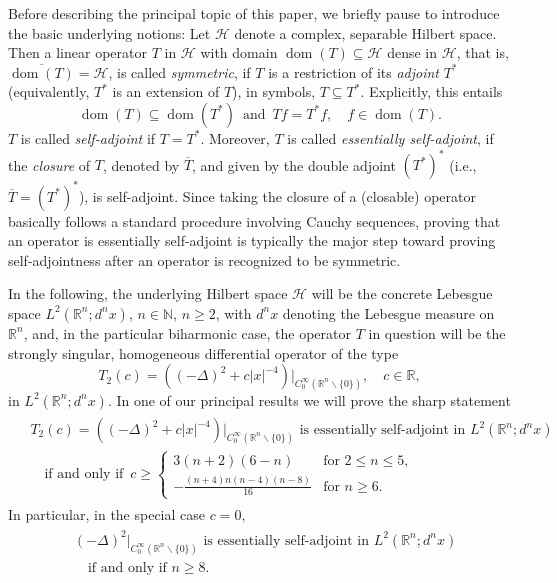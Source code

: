 \documentclass[reqno,11pt,centertags]{amsart}
\newcommand{\bbN}{{\mathbb{N}}}
\newcommand{\bbR}{{\mathbb{R}}}
\newcommand{\cH}{{\mathcal H}}
\newcommand{\<}{\langle}
\renewcommand{\>}{\rangle}
\newcommand{\lb}{\label}
\newcommand{\ol}{\overline}
\newcommand{\dom}{\operatorname{dom}}
\numberwithin{equation}{section}
\theoremstyle{definition}
\begin{document}
Before describing the principal topic of this paper, we briefly pause to introduce the basic underlying notions: Let $\cH$ denote a complex, separable Hilbert space. Then a linear operator $T$ in $\cH$ with domain $\dom(T) \subseteq \cH$ dense in $\cH$, that is, $\ol{\dom(T)} = \cH$, is called {\it symmetric}, if $T$ is a restriction of its {\it adjoint} $T^*$ (equivalently, $T^*$ is an extension of $T$), in symbols, $T \subseteq T^*$. Explicitly, this entails 
\begin{equation}
\dom(T) \subseteq \dom(T^*) \, \text{ and } \, Tf = T^*f, \quad f \in \dom(T). 
\end{equation} 
$T$ is called {\it self-adjoint} if $T=T^*$. Moreover, $T$ is called {\it essentially self-adjoint}, if the {\it closure} of $T$, denoted by $\ol T$, and given by the double adjoint $(T^*)^*$ (i.e., $\ol T = (T^*)^*$), is self-adjoint. Since taking the closure of a (closable) operator basically follows a standard procedure involving Cauchy sequences, proving that an operator is essentially self-adjoint is typically the major step toward proving self-adjointness after an operator is recognized to be symmetric. 

In the following, the underlying Hilbert space $\cH$ will be the concrete Lebesgue space $L^2(\bbR^n;d^nx)$, $n \in \bbN$, $n \geq 2$, with $d^n x$ denoting the Lebesgue measure on $\bbR^n$, and, in the particular biharmonic case,  the operator $T$ in question will be the strongly singular, homogeneous differential operator of the type 
\begin{equation}
T_2(c) = \left((-\Delta)^2 +c|x|^{-4}\right)\big|_{C_0^{\infty}(\bbR^n \backslash \{0\})}, \quad c \in \bbR,  
\end{equation}
in $L^2(\bbR^n;d^nx)$. In one of our principal results we will prove the sharp statement 
\begin{align} 
\begin{split} 
& \text{$T_2(c)=\left((-\Delta)^2 +c|x|^{-4}\right)\big|_{C_0^{\infty}(\bbR^n \backslash \{0\})}$ is essentially self-adjoint in $L^2(\bbR^n;d^nx)$}     \lb{1.3}\\
& \quad \text{if and only if } \,  
c \geq \begin{cases}
3(n+2)(6-n) & \mbox{for $2\leq n\leq 5$},   \\[5pt]
{\displaystyle -\frac{(n+4)n(n-4)(n-8)}{16}}& \mbox{for $n\geq 6$}.
\end{cases}
\end{split} 
\end{align} 
In particular, in the special case $c=0$, 
\begin{align}
\begin{split} 
& \text{$(-\Delta)^2\big|_{C_0^{\infty}(\bbR^n \backslash \{0\})}$ is essentially self-adjoint in 
$L^2(\bbR^n; d^n x)$}       \lb{1.4} \\ 
& \quad \text{if and only if $n \geq 8$}. 
\end{split}
\end{align} 
\end{document}
